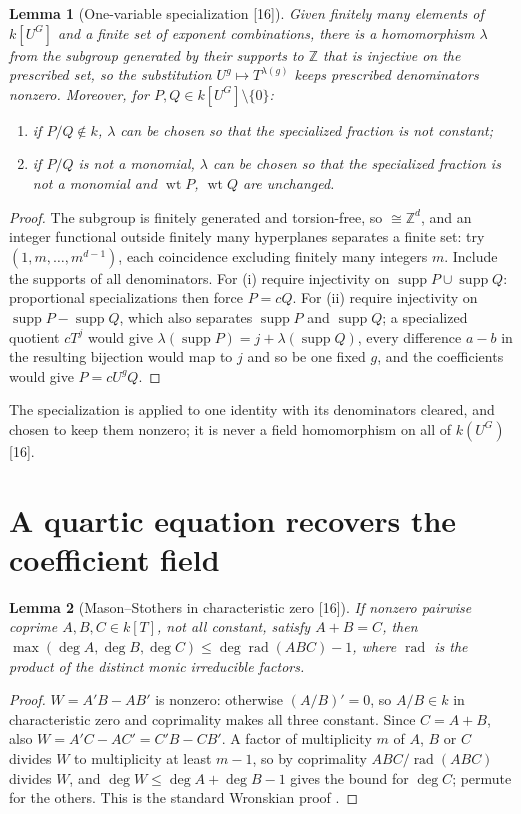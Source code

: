 \documentclass[11pt,oneside]{article}
\numberwithin{equation}{section}
\newtheorem{lemma}[lemma]{Lemma}
\theoremstyle{definition}
\theoremstyle{remark}
\newcommand{\Z}{\mathbb Z}
\newcommand{\supp}{\operatorname{supp}}
\newcommand{\src}[1]{\textup{\textsf{\small[#1]}}}
\begin{document}
\begin{lemma}[One-variable specialization \src{16}]\label{opa:cr:lem:specialize}
Given finitely many elements of $k[U^G]$ and a finite set of exponent combinations, there is a homomorphism
$\lambda$ from the subgroup generated by their supports to $\Z$ that is injective on the prescribed set, so
the substitution $U^g\mapsto T^{\lambda(g)}$ keeps prescribed denominators nonzero. Moreover, for
$P,Q\in k[U^G]\setminus\{0\}$:
\begin{enumerate}[label=\textup{(\roman*)},itemsep=1pt]
\item if $P/Q\notin k$, $\lambda$ can be chosen so that the specialized fraction is not constant;
\item if $P/Q$ is not a monomial, $\lambda$ can be chosen so that the specialized fraction is not a monomial
and $\operatorname{wt}P$, $\operatorname{wt}Q$ are unchanged.
\end{enumerate}
\end{lemma}
\begin{proof}
The subgroup is finitely generated and torsion-free, so $\cong\Z^d$, and an integer functional outside
finitely many hyperplanes separates a finite set: try $(1,m,\dots,m^{d-1})$, each coincidence excluding
finitely many integers $m$. Include the supports of all denominators. For (i) require injectivity on
$\supp P\cup\supp Q$: proportional specializations then force $P=cQ$. For (ii) require injectivity on
$\supp P-\supp Q$, which also separates $\supp P$ and $\supp Q$; a specialized quotient $cT^j$ would give
$\lambda(\supp P)=j+\lambda(\supp Q)$, every difference $a-b$ in the resulting bijection would map to $j$ and so
be one fixed $g$, and the coefficients would give $P=cU^gQ$.
\end{proof}

The specialization is applied to one identity with its denominators cleared, and chosen to keep them
nonzero; it is never a field homomorphism on all of $k(U^G)$ \src{16}.

\section{A quartic equation recovers the coefficient field}\label{opa:cr:sec:quartic}

\begin{lemma}[Mason--Stothers in characteristic zero \src{16}]\label{opa:cr:lem:abc}
If nonzero pairwise coprime $A,B,C\in k[T]$, not all constant, satisfy $A+B=C$, then
$\max(\deg A,\deg B,\deg C)\le\deg\operatorname{rad}(ABC)-1$, where $\operatorname{rad}$ is the product of
the distinct monic irreducible factors.
\end{lemma}
\begin{proof}
$W=A'B-AB'$ is nonzero: otherwise $(A/B)'=0$, so $A/B\in k$ in characteristic zero and coprimality makes
all three constant. Since $C=A+B$, also $W=A'C-AC'=C'B-CB'$. A factor of multiplicity $m$ of $A$, $B$ or $C$
divides $W$ to multiplicity at least $m-1$, so by coprimality $ABC/\operatorname{rad}(ABC)$ divides $W$, and
$\deg W\le\deg A+\deg B-1$ gives the bound for $\deg C$; permute for the others. This is the standard
Wronskian proof \cite{BL}.
\end{proof}
\end{document}
